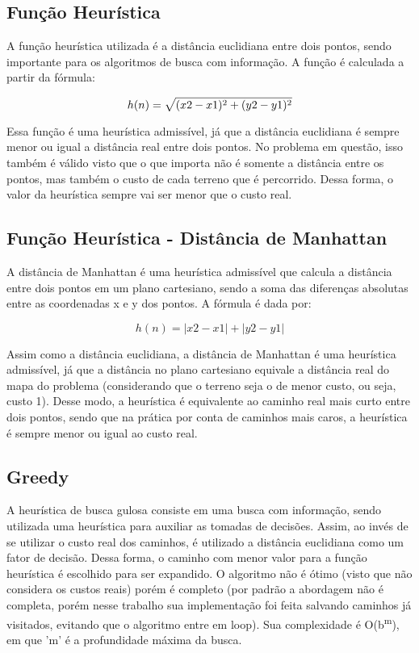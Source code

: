 \documentclass[10pt]{extarticle} %
\begin{document}
\subsection{Função Heurística}

A função heurística utilizada é a distância euclidiana entre dois pontos, sendo importante para os algoritmos de busca com informação. A função é calculada a partir da fórmula: 

\begin{equation}
    h(n) = \sqrt{(x2 - x1)\textsuperscript{2} + (y2 - y1)\textsuperscript{2}}
\end{equation}

Essa função é uma heurística admissível, já que a distância euclidiana é sempre menor ou igual a distância real entre dois pontos. No problema em questão, isso também é válido visto que o que importa não é somente a distância entre os pontos, mas também o custo de cada terreno que é percorrido. Dessa forma, o valor da heurística sempre vai ser menor que o custo real.

\subsection{Função Heurística - Distância de Manhattan}

A distância de Manhattan é uma heurística admissível que calcula a distância entre dois pontos em um plano cartesiano, sendo a soma das diferenças absolutas entre as coordenadas x e y dos pontos. A fórmula é dada por:

\begin{equation}
    h(n) = |x2 - x1| + |y2 - y1|
\end{equation}

Assim como a distância euclidiana, a distância de Manhattan é uma heurística admissível, já que a distância no plano cartesiano equivale a distância real do mapa do problema (considerando que o terreno seja o de menor custo, ou seja, custo 1). Desse modo, a heurística é equivalente ao caminho real mais curto entre dois pontos, sendo que na prática por conta de caminhos mais caros, a heurística é sempre menor ou igual ao custo real.

\subsection{Greedy}

A heurística de busca gulosa consiste em uma busca com informação, sendo utilizada uma heurística para auxiliar as tomadas de decisões. Assim, ao invés de se utilizar o custo real dos caminhos, é utilizado a distância euclidiana como um fator de decisão. Dessa forma, o caminho com menor valor para a função heurística é escolhido para ser expandido. O algoritmo não é ótimo (visto que não considera os custos reais) porém é completo (por padrão a abordagem não é completa, porém nesse trabalho sua implementação foi feita salvando caminhos já visitados, evitando que o algoritmo entre em loop). Sua complexidade é O(b\textsuperscript{m}), em que 'm' é a profundidade máxima da busca.
\end{document}
